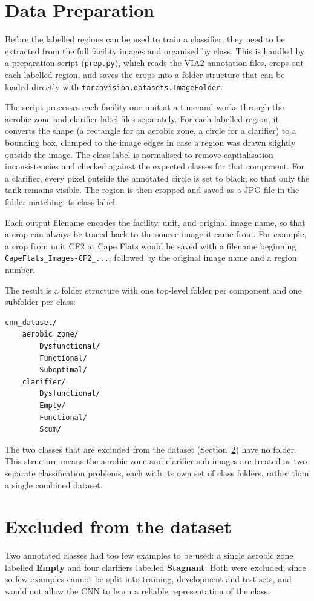 \section{Data Preparation}\label{sec:pipeline}

Before the labelled regions can be used to train a classifier, they need to be extracted from the full facility images and organised by class. This is handled by a preparation script (\texttt{prep.py}), which reads the VIA2 annotation files, crops out each labelled region, and saves the crops into a folder structure that can be loaded directly with \texttt{torchvision.datasets.ImageFolder}.

The script processes each facility one unit at a time and works through the aerobic zone and clarifier label files separately. For each labelled region, it converts the shape (a rectangle for an aerobic zone, a circle for a clarifier) to a bounding box, clamped to the image edges in case a region was drawn slightly outside the image. The class label is normalised to remove capitalisation inconsistencies and checked against the expected classes for that component. For a clarifier, every pixel outside the annotated circle is set to black, so that only the tank remains visible. The region is then cropped and saved as a JPG file in the folder matching its class label.

Each output filename encodes the facility, unit, and original image name, so that a crop can always be traced back to the source image it came from. For example, a crop from unit CF2 at Cape Flats would be saved with a filename beginning \texttt{CapeFlats\_Images-CF2\_...}, followed by the original image name and a region number.

The result is a folder structure with one top-level folder per component and one subfolder per class:

{\footnotesize
\begin{verbatim}
cnn_dataset/
    aerobic_zone/
        Dysfunctional/
        Functional/
        Suboptimal/
    clarifier/
        Dysfunctional/
        Empty/
        Functional/
        Scum/
\end{verbatim}
}

The two classes that are excluded from the dataset (Section~\ref{sec:excluded}) have no folder. This structure means the aerobic zone and clarifier sub-images are treated as two separate classification problems, each with its own set of class folders, rather than a single combined dataset.


\section{Excluded from the dataset}\label{sec:excluded}
Two annotated classes had too few examples to be used: a single aerobic zone labelled \textbf{Empty} and four clarifiers labelled \textbf{Stagnant}. Both were excluded, since so few examples cannot be split into training, development and test sets, and would not allow the CNN to learn a reliable representation of the class.


